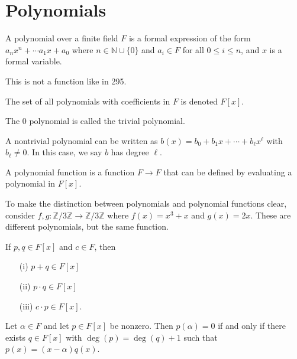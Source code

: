 \section{Polynomials}
\begin{definition}
	A polynomial over a finite field \(F\) is a formal expression of the form \(a_n x^n + \cdots a_1 x + a_0\) where \(n \in \mathbb{N} \cup \{ 0 \} \) and \(a_i \in F\) for all \(0 \leq i \leq n\), and \(x \) is a formal variable.
    \begin{note}
        This is not a function like in 295.
    \end{note}
\end{definition}
\begin{definition}
	The set of all polynomials with coefficients in \(F\) is denoted \(F[x]\).
\end{definition}
\begin{definition}
	The 0 polynomial is called the trivial polynomial.
\end{definition}
\begin{definition}
	A nontrivial polynomial can be written as \(b(x) = b_0 + b_1 x + \cdots +  b_{\ell }  x^{\ell } \) with \(b_{\ell} \neq 0 \). In this case, we say \(b\) has degree \(\ell \).
\end{definition}
\begin{definition}
    A polynomial function is a function \(F \to F\) that can be defined by evaluating a polynomial in \(F[x]\).  
\end{definition}
\begin{eg}
    To make the distinction between polynomials and polynomial functions clear, consider \(f,g \colon \mathbb{Z} /3\mathbb{Z} \to \mathbb{Z} /3\mathbb{Z} \) where \(f(x)=x^3 + x\) and \(g(x)=2x\). These are different polynomials, but the same function.
\end{eg}
\begin{lemma}
    If \(p,q \in F[x]\) and \(c \in F\), then
    \begin{itemize}
        \item[(i)] \(p+q \in F[x]\)
        \item[(ii)] \(p\cdot q \in F[x]\)
        \item[(iii)] \(c \cdot p \in F[x]\).
    \end{itemize}  
\end{lemma}
\begin{lemma}[Descartes]
    Let \(\alpha  \in F\) and let \(p \in F[x]\) be nonzero. Then \(p(\alpha )=0\) if and only if there exists \(q \in F[x]\) with \(\deg(p)=\deg(q)+1\) such that \(p(x)=(x-\alpha )q(x)\).
\end{lemma}
